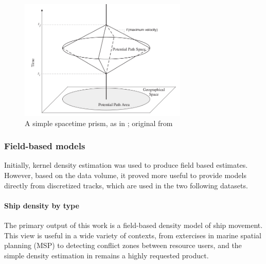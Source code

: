 \documentclass[12pt,letterpaper]{article}
\begin{document}
\begin{figure}[h!]
  \centering
    \includegraphics[width=80mm]{images/measurement-theory-for-time-geography-prism.png}
  \caption {A simple space{\textendash}time prism, as in \citep{Miller2005}; original from \citep{Wu2002}}
  \label{fig:time-prism}
\end{figure}


\subsubsection{Field-based models}

Initially, kernel density estimation was used to produce field based estimates. However, based on the data volume, it proved more useful to provide models directly from discretized tracks, which are used in the two following datasets.

\paragraph{Ship density by type}

The primary output of this work is a field-based density model of ship movement. This view is useful in a wide variety of contexts, from extercises in marine spatial planning (MSP) to detecting conflict zones between resource users, and the simple density estimation in \cite{Halpern2008} remains a highly requested product. %
\end{document}

